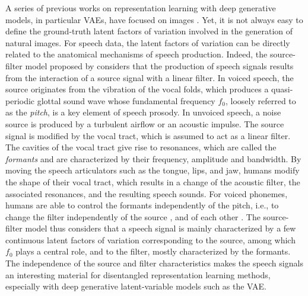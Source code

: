 \documentclass[review]{elsarticle}
\begin{document}
A series of previous works on representation learning with deep generative models, in particular VAEs, have focused on images \citep{higgins2016beta,kim2018disentangling,chen2018isolating, locatello2019challenging, locatello2020sober}. Yet, it is not always easy to define the ground-truth latent factors of variation involved in the generation of natural images. For speech data, the latent factors of variation can be directly related to the anatomical mechanisms of speech production. Indeed, the source-filter model proposed by \cite{fant1970acoustic} considers that the production of speech signals results from the interaction of a source signal with a linear filter. In voiced speech, the source originates from the vibration of the vocal folds, which produces a quasi-periodic glottal sound wave whose fundamental frequency $f_0$, loosely referred to as the \emph{pitch}, is a key element of speech prosody. In unvoiced speech, a noise source is produced by a turbulent airflow or an acoustic impulse. The source signal is modified by the vocal tract, which is assumed to act as a linear filter. The cavities of the vocal tract give rise to resonances, which are called the \emph{formants} and are characterized by their frequency, amplitude and bandwidth. By moving the speech articulators such as the tongue, lips, and jaw, humans modify the shape of their vocal tract, which results in a change of the acoustic filter, the associated resonances, and the resulting speech sounds. For voiced phonemes, humans are able to control the formants independently of the pitch, i.e., to change the filter independently of the source \citep{fant1970acoustic}, and of each other \citep{macdonald2011probing}. The source-filter model thus considers that a speech signal is mainly characterized by a few continuous latent factors of variation corresponding to the source, among which $f_0$ plays a central role, and to the filter, mostly characterized by the formants. The independence of the source and filter characteristics makes the speech signals an interesting material for disentangled representation learning methods, especially with deep generative latent-variable models such as the VAE. 
\end{document}
